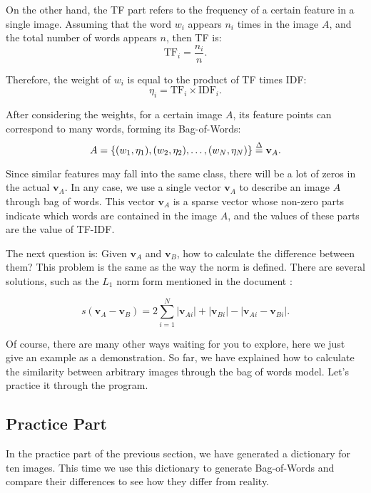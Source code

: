 On the other hand, the TF part refers to the frequency of a certain feature in a single image. Assuming that the word $w_i$ appears $n_i$ times in the image $A$, and the total number of words appears $n$, then TF is:
\begin{equation}
	\mathrm{TF}_i = \frac{n_i}{n}.
\end{equation}

Therefore, the weight of $w_i$ is equal to the product of TF times IDF:
\begin{equation}
	\eta_i = \mathrm{TF}_i \times \mathrm{IDF}_i.
\end{equation}

After considering the weights, for a certain image $A$, its feature points can correspond to many words, forming its Bag-of-Words:
\begin{equation}
	A = \left\{ (w_1, \eta_1), (w_2, \eta_2), \ldots, (w_N, \eta_N)  \right\} \buildrel \Delta \over = \mathbf{v}_A.
\end{equation}

Since similar features may fall into the same class, there will be a lot of zeros in the actual $\mathbf{v}_A$. In any case, we use a single vector $\mathbf{v}_A$ to describe an image $A$ through bag of words. This vector $\mathbf{v}_A$ is a sparse vector whose non-zero parts indicate which words are contained in the image $A$, and the values of these parts are the value of TF-IDF.

The next question is: Given $\mathbf{v}_A$ and $\mathbf{v}_B$, how to calculate the difference between them? This problem is the same as the way the norm is defined. There are several solutions, such as the $L_1$ norm form mentioned in the document \cite{Nister2006}:

\begin{equation}
	s\left( {{\mathbf{v}_A} - {\mathbf{v}_B}} \right) = 2\sum\limits_{i = 1}^N {\left| {{\mathbf{v}_{Ai}}} \right| + \left| {{\mathbf{v}_{Bi}}} \right| - \left| {{\mathbf{v}_{Ai}} - {\mathbf{v}_{Bi}}} \right|}.
\end{equation}

Of course, there are many other ways waiting for you to explore, here we just give an example as a demonstration. So far, we have explained how to calculate the similarity between arbitrary images through the bag of words model. Let's practice it through the program.

\subsection{Practice Part}
In the practice part of the previous section, we have generated a dictionary for ten images. This time we use this dictionary to generate Bag-of-Words and compare their differences to see how they differ from reality.

